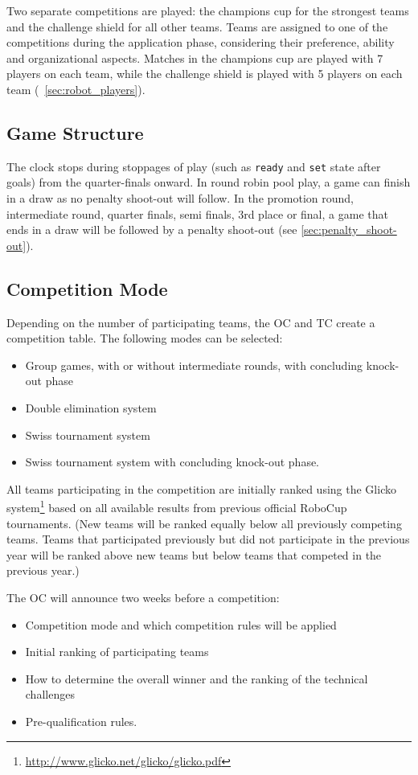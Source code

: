 Two separate competitions are played: the champions cup for the strongest teams and the challenge shield for all other teams.
Teams are assigned to one of the competitions during the application phase, considering their preference, ability and organizational aspects.
Matches in the champions cup are played with 7 players on each team, while the challenge shield is played with 5 players on each team (\cf~\cref{sec:robot_players}).

\subsection{Game Structure}

The clock stops during stoppages of play (such as \texttt{ready} and \texttt{set} state after goals) from the quarter-finals onward.
In round robin pool play, a game can finish in a draw as no penalty shoot-out will follow.
In the promotion round, intermediate round, quarter finals, semi finals, 3rd place or final, a game that ends in a draw will be followed by a penalty shoot-out (see \cref{sec:penalty_shoot-out}).

\subsection{Competition Mode}

Depending on the number of participating teams, the OC and TC create a competition table.
The following modes can be selected:
\begin{itemize}
  \item Group games, with or without intermediate rounds, with concluding knock-out phase
  \item Double elimination system
  \item Swiss tournament system
  \item Swiss tournament system with concluding knock-out phase.
\end{itemize}

All teams participating in the competition are initially ranked using the Glicko system\footnote{\url{http://www.glicko.net/glicko/glicko.pdf}} based on all available results from previous official RoboCup tournaments.
(New teams will be ranked equally below all previously competing teams.
Teams that participated previously but did not participate in the previous year will be ranked above new teams but below teams that competed in the previous year.)

The OC will announce two weeks before a competition:
\begin{itemize}
  \item Competition mode and which competition rules will be applied
  \item Initial ranking of participating teams
  \item How to determine the overall winner and the ranking of the technical challenges
  \item Pre-qualification rules.
\end{itemize}

